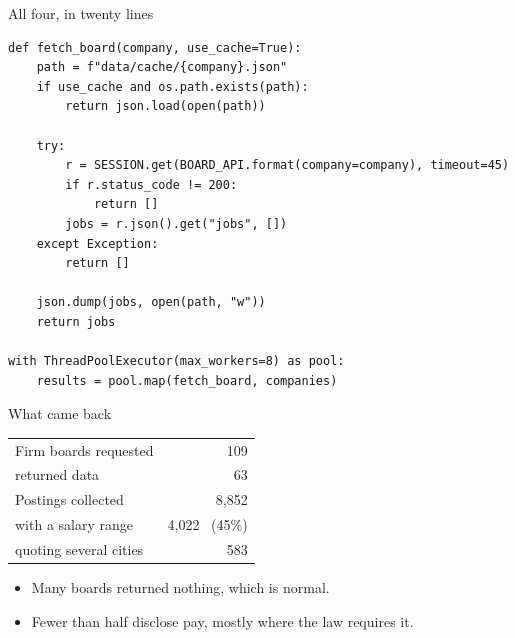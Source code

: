 \documentclass[11pt,aspectratio=169]{beamer}
\newenvironment{wideitemize}
  {\begin{itemize}\setlength{\itemsep}{10pt}}
  {\end{itemize}}
\begin{document}
\begin{frame}[fragile]{All four, in twenty lines}
\begin{lstlisting}[style=py]
def fetch_board(company, use_cache=True):
    path = f"data/cache/{company}.json"
    if use_cache and os.path.exists(path):
        return json.load(open(path))

    try:
        r = SESSION.get(BOARD_API.format(company=company), timeout=45)
        if r.status_code != 200:
            return []
        jobs = r.json().get("jobs", [])
    except Exception:
        return []

    json.dump(jobs, open(path, "w"))
    return jobs

with ThreadPoolExecutor(max_workers=8) as pool:
    results = pool.map(fetch_board, companies)
\end{lstlisting}
\end{frame}

\begin{frame}{What came back}
\begin{table}
\centering\small
\begin{tabular}{lr}
\toprule
Firm boards requested       & 109 \\
\quad returned data         & 63 \\
Postings collected          & 8{,}852 \\
\quad with a salary range   & 4{,}022 \ (45\%) \\
\quad quoting several cities & 583 \\
\bottomrule
\end{tabular}
\end{table}

\vspace{0.5em}
\begin{wideitemize}
  \item Many boards returned nothing, which is normal.
  \item Fewer than half disclose pay, mostly where the law requires it.
\end{wideitemize}
\end{frame}

\end{document}
